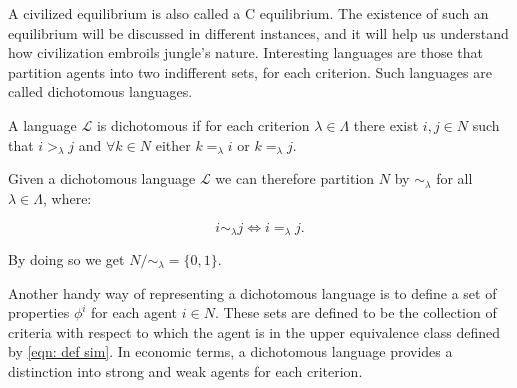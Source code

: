 A civilized equilibrium is also called a C equilibrium. The existence of such an equilibrium will be discussed in different instances, and it will help us understand how civilization embroils jungle's nature. Interesting languages are those that partition agents into two indifferent sets, for each criterion. Such languages are called dichotomous languages.

\begin{definition}\label{def: dichotomous language}
    A language $\mathcal{L}$ is dichotomous if for each criterion $\lambda\in\Lambda$ there exist $i,j\in N$ such that $i>_{\lambda}j$ and $\forall k\in N$ either $k=_{\lambda}i$ or $k=_{\lambda}j$.
\end{definition}

Given a dichotomous language $\mathcal{L}$ we can therefore partition $N$ by $\sim_{\lambda}$ for all $\lambda\in\Lambda$, where:

\begin{equation}\label{eqn: def sim}
    i\sim_{\lambda} j \Leftrightarrow i=_{\lambda}j.
\end{equation}

By doing so we get $N/\sim_{\lambda}=\{0,1\}$. 

Another handy way of representing a dichotomous language is to define a set of properties $\phi^i$ for each agent $i\in N$. These sets are defined to be the collection of criteria with respect to which the agent is in the upper equivalence class defined by \cref{eqn: def sim}. In economic terms, a dichotomous language provides a distinction into strong and weak agents for each criterion. 


